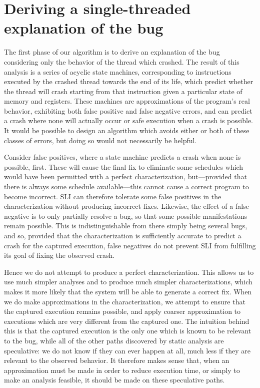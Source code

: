 \documentclass[10pt,twocolumn,preprint,natbib,authoryear]{sigplanconf}
\newcommand{\editorial}[1]{}
\begin{document}
\section{Deriving a single-threaded explanation of the bug}
\label{sect:build_state_machines}

The first phase of our algorithm is to derive an explanation of the
bug considering only the behavior of the thread which crashed.  The
result of this analysis is a series of acyclic state machines,
corresponding to instructions executed by the crashed thread towards
the end of its life, which predict whether the thread will crash
starting from that instruction given a particular state of memory and
registers.  These machines are approximations of the program's real
behavior, exhibiting both false positive and false negative errors,
and can predict a crash where none will actually occur or safe
execution when a crash is possible.  It would be possible to design an
algorithm which avoids either or both of these classes of errors, but
doing so would not necessarily be helpful.

Consider false positives, where a state machine predicts a crash when
none is possible, first.  These will cause the final fix to eliminate
some schedules which would have been permitted with a perfect
characterization, but---provided that there is always some schedule
available---this cannot cause a correct program to become incorrect.
SLI can therefore tolerate some false positives in the
characterization without producing incorrect fixes.  Likewise, the
effect of a false negative is to only partially resolve a bug, so that
some possible manifestations remain possible.  This is
indistinguishable from there simply being several bugs, and so,
provided that the characterization is sufficiently accurate to predict
a crash for the captured execution, false negatives do not prevent SLI
from fulfilling its goal of fixing the observed crash.\editorial{Feels
  glib.}

Hence we do not attempt to produce a perfect characterization.  This
allows us to use much simpler analyses and to produce much simpler
characterizations, which makes it more likely that the system will be
able to generate a correct fix.  When we do make approximations in the
characterization, we attempt to ensure that the captured execution
remains possible, and apply coarser approximation to executions which
are very different from the captured one.  The intuition behind this
is that the captured execution is the only one which is known to be
relevant to the bug, while all of the other paths discovered by static
analysis are speculative: we do not know if they can ever happen at
all, much less if they are relevant to the observed behavior.  It
therefore makes sense that, when an approximation must be made in
order to reduce execution time, or simply to make an analysis
feasible, it should be made on these speculative paths.
\end{document}

